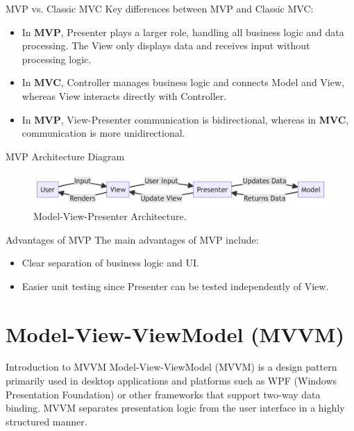 \documentclass[aspectratio=169, table]{beamer}
\begin{document}
\begin{frame}[fragile]{MVP vs. Classic MVC}
	\vspace{20pt}
	Key differences between MVP and Classic MVC:
	\begin{itemize}
		\item In \textbf{MVP}, Presenter plays a larger role, handling all business logic and data processing. The View only displays data and receives input without processing logic.
		\item In \textbf{MVC}, Controller manages business logic and connects Model and View, whereas View interacts directly with Controller.
		\item In \textbf{MVP}, View-Presenter communication is bidirectional, whereas in \textbf{MVC}, communication is more unidirectional.
	\end{itemize}
\end{frame}

\begin{frame}[fragile]{MVP Architecture Diagram}
	\vspace{20pt}
	\begin{figure}[h]
		\centering
		\includegraphics[width=\textwidth]{../images/mvp.png}
		\caption{Model-View-Presenter Architecture.}
		\label{fig:mvp-architecture}
	\end{figure}
\end{frame}

\begin{frame}[fragile]{Advantages of MVP}
	\vspace{20pt}
	The main advantages of MVP include:
	\begin{itemize}
		\item Clear separation of business logic and UI.
		\item Easier unit testing since Presenter can be tested independently of View.
	\end{itemize}
\end{frame}

\section{Model-View-ViewModel (MVVM)}

\begin{frame}[fragile]{Introduction to MVVM}
	\vspace{20pt}
	Model-View-ViewModel (MVVM) is a design pattern primarily used in desktop applications and platforms such as WPF (Windows Presentation Foundation) or other frameworks that support two-way data binding. MVVM separates presentation logic from the user interface in a highly structured manner.
\end{frame}
\end{document}
